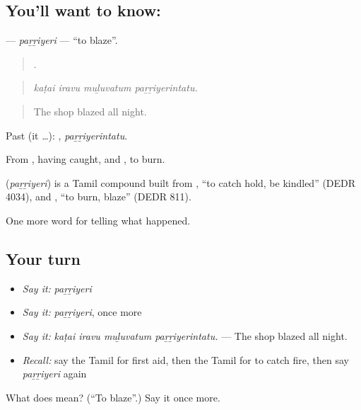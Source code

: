 \subsection*{You'll want to know: }
\textbf{} — \emph{paṟṟiyeri} — \textquotedblleft{}to blaze\textquotedblright{}.

\begin{quote}
   .
\end{quote}

\begin{quote}
\emph{kaṭai iravu muḻuvatum paṟṟiyerintatu.}
\end{quote}

\begin{quote}
The shop blazed all night.
\end{quote}

Past (it …): , \emph{paṟṟiyerintatu}.

From , having caught, and , to burn.

\begin{cousinweb}
\textbf{} (\emph{paṟṟiyeri}) is a Tamil compound built from , \textquotedblleft{}to catch hold, be kindled\textquotedblright{} (DEDR 4034), and , \textquotedblleft{}to burn, blaze\textquotedblright{} (DEDR 811).
\end{cousinweb}

\begin{grammarlens}[title={What you've built}]
One more word for telling what happened.
\end{grammarlens}

\subsection*{Your turn}
\begin{itemize}
\raggedright
  \item \emph{Say it:} \emph{paṟṟiyeri}
  \item \emph{Say it:} \emph{paṟṟiyeri}, once more
  \item \emph{Say it:} \emph{kaṭai iravu muḻuvatum paṟṟiyerintatu.} — The shop blazed all night.
  \item \emph{Recall:} say the Tamil for first aid, then the Tamil for to catch fire, then say \emph{paṟṟiyeri} again
\end{itemize}

\begin{tcolorbox}[breakable,colback=teal!4,colframe=teal!35!black,title={Before you move on}]
What does  mean? (\textquotedblleft{}To blaze\textquotedblright{}.) Say it once more.
\end{tcolorbox}
